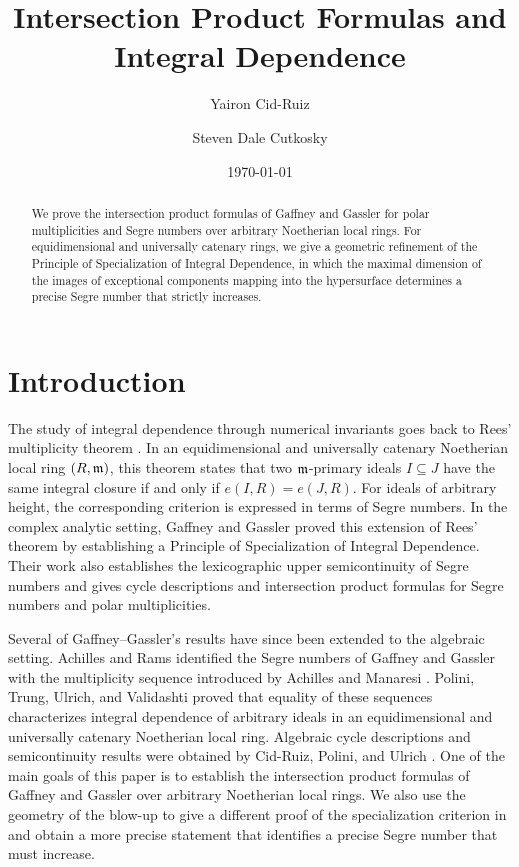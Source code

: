 \documentclass[a4paper, 11pt]{amsart}
\title{Intersection Product Formulas and Integral Dependence}
\author{Yairon Cid-Ruiz}
\author{Steven Dale Cutkosky}
\date{\today}
\newcommand{\mm}{{\normalfont\mathfrak{m}}}
\theoremstyle{definition}
\begin{document}
	\begin{abstract}
		We prove the intersection product formulas of Gaffney and Gassler for polar multiplicities and Segre numbers over arbitrary Noetherian local rings. 
		For equidimensional and universally catenary rings, we give a geometric refinement of the Principle of Specialization of Integral Dependence, in which the maximal dimension of the images of exceptional components mapping into the hypersurface determines a precise Segre number that strictly increases.
	\end{abstract}
	
	\maketitle
	
	\vspace*{-.6cm}
	
	\section{Introduction}
	\label{sec:introduction}
	
	The study of integral dependence through numerical invariants goes back to Rees' multiplicity theorem \cite{Rees61}.
	In an equidimensional and universally catenary Noetherian local ring $(R,\mm)$, this theorem states that two $\mm$-primary ideals $I\subseteq J$ have the same integral closure if and only if $e(I,R)=e(J,R)$. 
	For ideals of arbitrary height, the corresponding criterion is expressed in terms of Segre numbers. 
	In the complex analytic setting, Gaffney and Gassler \cite{GG} proved this extension of Rees' theorem by establishing a Principle of Specialization of Integral Dependence. 
	Their work also establishes the lexicographic upper semicontinuity of Segre numbers and gives cycle descriptions and intersection product formulas for Segre numbers and polar multiplicities.
	
	Several of Gaffney--Gassler's results have since been extended to the algebraic setting.
	Achilles and Rams \cite{AR} identified the Segre numbers of Gaffney and Gassler with the multiplicity sequence introduced by Achilles and Manaresi \cite{AM}.
	Polini, Trung, Ulrich, and Validashti \cite{PTUV} proved that equality of these sequences characterizes integral dependence of arbitrary ideals in an equidimensional and universally catenary Noetherian local ring.
	Algebraic cycle descriptions and semicontinuity results were obtained by Cid-Ruiz, Polini, and Ulrich \cite{CRPU}. 
	One of the main goals of this paper is to establish the intersection product formulas of Gaffney and Gassler over arbitrary Noetherian local rings. 
	We also use the geometry of the blow-up to give a different proof of the specialization criterion in \cite[Theorem~3.3]{PTUV} and obtain a more precise statement that identifies a precise Segre number that must increase.
	
\end{document}
